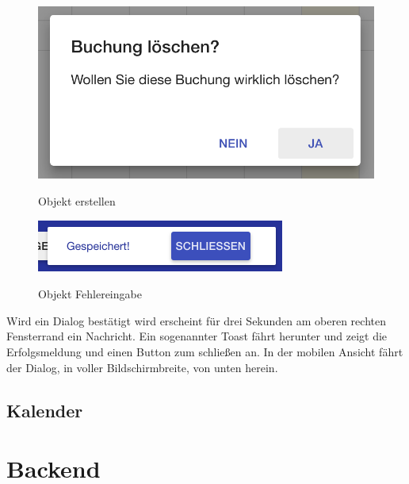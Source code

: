 \begin{figure}[H]
    \centering
    \begin{minipage}[t]{0.49\linewidth}
        \centering
        \includegraphics[width=\linewidth]{images/frontend_booking_delete_dialog.png}
        \label{frontend_booking_delete_dialog}
        \caption{Objekt erstellen}
    \end{minipage}%
    \hfill
    \begin{minipage}[t]{0.49\linewidth}
        \centering
        \includegraphics[width=\linewidth]{images/frontend_toast.png}
        \label{frontend_toast}
        \caption{Objekt Fehlereingabe}
    \end{minipage}
\end{figure}


Wird ein Dialog bestätigt wird erscheint für drei Sekunden am oberen rechten Fensterrand ein Nachricht. Ein sogenannter Toast fährt herunter und zeigt die Erfolgsmeldung und einen Button zum schließen an. In der mobilen Ansicht fährt der Dialog, in voller Bildschirmbreite, von unten herein. 

\subsection{Kalender}

 
\section{Backend}
